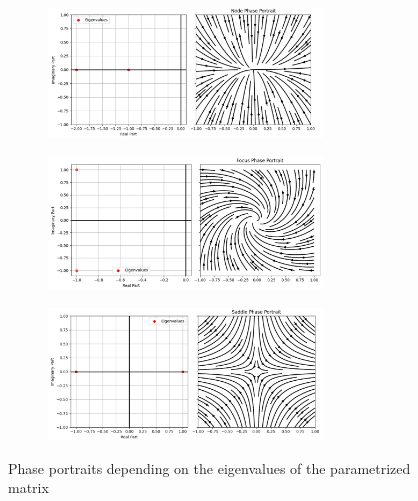 
\begin{figure}[H]
    \centering
    \begin{subfigure}[b]{\textwidth}
        \centering
        \includegraphics[width=0.8\textwidth]{images/4-1-Node.png}
    \end{subfigure}
    \begin{subfigure}[b]{\textwidth}
        \centering
        \includegraphics[width=0.8\textwidth]{images/4-1-Focus.png}
    \end{subfigure}
    \begin{subfigure}[b]{\textwidth}
        \centering
        \includegraphics[width=0.8\textwidth]{images/4-1-Saddle.png}
    \end{subfigure}
    \caption{Phase portraits depending on the eigenvalues of the parametrized matrix}
    \label{fig:task1}
\end{figure}

